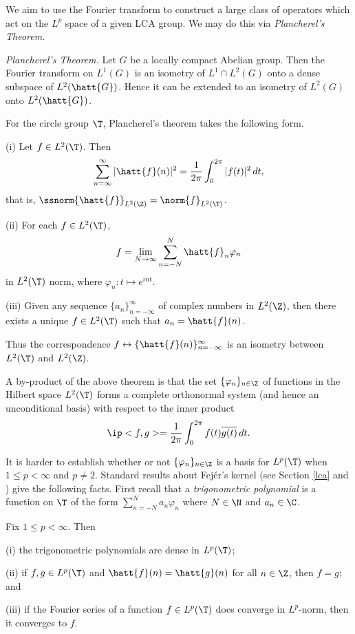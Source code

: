 We aim to use the Fourier transform to construct a large class of operators
which act on the $L^p$ space of a given LCA group. We may do this via {\em
Plancherel's Theorem}.

\begin{theorem}\label{isometry}\cite[Chapter VII, \S 4]{Katznelson}
{\em Plancherel's Theorem.} Let $G$ be a locally compact Abelian group. Then the
Fourier transform on $L^1(G)$ is an isometry of $L^1\cap L^2(G)$ onto a dense
subspace of $L^2(\hatt{G})$. Hence it can be extended to an isometry of $L^2(G)$
onto $L^2(\hatt{G})$.
\end{theorem}

For the circle group $\T$, Plancherel's theorem takes the following form.

\begin{theorem}\label{Plancherel for T}\cite[Theorem I.5.5]{Katznelson}

(i) Let $f\in L^2(\T)$. Then
\[\sum_{n=\infty}^{\infty}|\hatt{f}(n)|^2=
\frac{1}{2\pi}\int_0^{2\pi}|f(t)|^2\,dt,\]
that is, $\ssnorm{\hatt{f}}_{L^2(\Z)}=\norm{f}_{L^2(\T)}$.

(ii) For each $f\in L^2(\T)$,
\[f=\lim_{N\rightarrow\infty}\sum_{n=-N}^N\hatt{f}_n\varphi_n\]
in $L^2(\T)$ norm, where $\varphi_n:t\mapsto e^{int}$.

(iii) Given any sequence $\{a_n\}_{n=-\infty}^{\infty}$ of complex numbers in
$L^2(\Z)$, then there exists a unique $f\in L^2(\T)$ such that
$a_n=\hatt{f}(n)$.

Thus the correspondence $f\leftrightarrow\{\hatt{f}(n)\}_{n=-\infty}^{\infty}$
is an isometry between $L^2(\T)$ and $L^2(\Z)$.
\end{theorem}


A by-product of the above theorem is that the set $\{\varphi_n\}_{n\in\Z}$ of
functions in the Hilbert space $L^2(\T)$ forms a complete orthonormal system
(and
hence an unconditional basis) with respect to the inner product
\[\ip<f,g>=\frac{1}{2\pi}\int_0^{2\pi}f(t)\overline{g(t)}\,dt.\]

It is harder to establish whether or not $\{\varphi_n\}_{n\in\Z}$ is a basis for
$L^p(\T)$ when $1\leq p<\infty$ and $p\neq2$. Standard results about Fej\'{e}r's
kernel (see Section \ref{lca} and \cite[I.2.6]{Katznelson}) give the following
facts. First recall that a {\em trigonometric polynomial} is a function on
$\T$ of
the form $\sum_{n=-N}^Na_n\varphi_n$ where $N\in\N$ and $a_n\in\C$.

\begin{theorem}\label{Fejer facts}
Fix $1\leq p<\infty$. Then

(i) the trigonometric polynomials are dense in $L^p(\T)$;

(ii) if $f,g\in L^p(\T)$ and $\hatt{f}(n)=\hatt{g}(n)$ for all $n\in\Z$,
then $f=g$; and


(iii) if the Fourier series of a function $f\in L^p(\T)$ does converge in
$L^p$-norm, then it converges to $f$.
\end{theorem}

